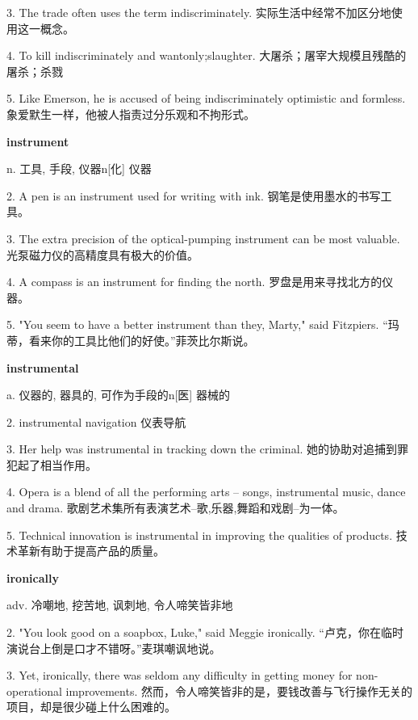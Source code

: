 \documentclass[12pt]{book}
\begin{document}
3.  The trade often uses the term indiscriminately.  实际生活中经常不加区分地使用这一概念。 


4.  To kill indiscriminately and wantonly;slaughter.  大屠杀；屠宰大规模且残酷的屠杀；杀戮 


5.  Like Emerson, he is accused of being indiscriminately optimistic and formless.  象爱默生一样，他被人指责过分乐观和不拘形式。 


\vspace{12pt}

\textbf{instrument}

n. 工具, 手段, 仪器n[化] 仪器

2.  A pen is an instrument used for writing with ink.  钢笔是使用墨水的书写工具。 


3.  The extra precision of the optical-pumping instrument can be most valuable.  光泵磁力仪的高精度具有极大的价值。 


4.  A compass is an instrument for finding the north.  罗盘是用来寻找北方的仪器。 


5.  "You seem to have a better instrument than they, Marty," said Fitzpiers.  “玛蒂，看来你的工具比他们的好使。”菲茨比尔斯说。 


\vspace{12pt}

\textbf{instrumental}

a. 仪器的, 器具的, 可作为手段的n[医] 器械的

2.  instrumental navigation  仪表导航 


3.  Her help was instrumental in tracking down the criminal.  她的协助对追捕到罪犯起了相当作用。 


4.  Opera is a blend of all the performing arts -- songs, instrumental music, dance and drama.  歌剧艺术集所有表演艺术--歌,乐器,舞蹈和戏剧--为一体。 


5.  Technical innovation is instrumental in improving the qualities of products.  技术革新有助于提高产品的质量。 


\vspace{12pt}

\textbf{ironically}

adv. 冷嘲地, 挖苦地, 讽刺地, 令人啼笑皆非地

2.  "You look good on a soapbox, Luke," said Meggie ironically.  “卢克，你在临时演说台上倒是口才不错呀。”麦琪嘲讽地说。 


3.  Yet, ironically, there was seldom any difficulty in getting money for non-operational improvements.  然而，令人啼笑皆非的是，要钱改善与飞行操作无关的项目，却是很少碰上什么困难的。 
\end{document}

